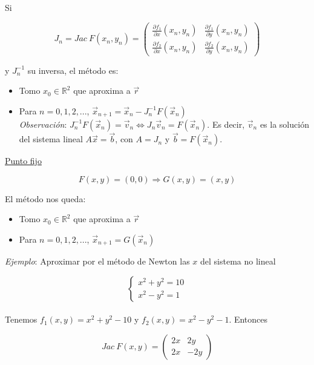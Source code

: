 Si

$$J_{n} = Jac\ F(x_{n}, y_{n}) = \begin{pmatrix}
        \frac{\partial f_{1}}{\partial x}(x_{n}, y_{n}) & \frac{\partial f_{1}}{\partial y}(x_{n}, y_{n})\\
        \frac{\partial f_{2}}{\partial x}(x_{n}, y_{n}) & \frac{\partial f_{2}}{\partial y}(x_{n}, y_{n})
    \end{pmatrix}$$

y $J_{n}^{-1}$ su inversa, el m\'etodo es:

\begin{itemize}
    \item Tomo $x_{0} \in \mathbb{R}^{2}$ que aproxima a $\Vec{r}$

    \item Para $n = 0, 1, 2, ...$, $\Vec{x}_{n + 1} = \Vec{x}_{n} - J_{n}^{-1}F(\Vec{x}_{n})$\\

    \textit{Observaci\'on}: $J_{n}^{-1}F(\Vec{x}_{n}) = \Vec{v}_{n} \iff J_{n}\Vec{v}_{n} = F(\Vec{x}_{n})$. Es decir, $\Vec{v}_{n}$ es la soluci\'on del sistema lineal $A\Vec{x} = \Vec{b}$, con $A = J_{n}$ y $\Vec{b} = F(\Vec{x}_{n})$.\\
\end{itemize}

\underline{Punto fijo}

$$F(x, y) = (0, 0) \Rightarrow G(x, y) = (x, y)$$

El m\'etodo nos queda:

\begin{itemize}
    \item Tomo $x_{0} \in \mathbb{R}^{2}$ que aproxima a $\Vec{r}$

    \item Para $n = 0, 1, 2, ...$, $\Vec{x}_{n + 1} = G(\Vec{x}_{n})$\\
\end{itemize}

\textit{Ejemplo}: Aproximar por el m\'etodo de Newton las $x$ del sistema no lineal

$$
    \begin{cases}
        x^{2} + y^{2} = 10\\
        x^{2} - y^{2} = 1
    \end{cases}
$$\\

Tenemos $f_{1}(x, y ) = x^{2} + y^{2} - 10$ y $f_{2}(x, y) = x^{2} - y^{2} - 1$. Entonces

$$Jac\ F(x, y) = \begin{pmatrix}
        2x & 2y\\
        2x & -2y
    \end{pmatrix}$$\\

